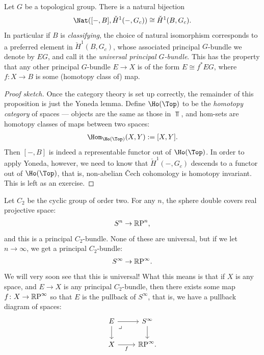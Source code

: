 \documentclass[11pt]{book}
\begin{document}
\begin{proposition}\label{prop:classifying-bundle}
Let $G$ be a topological group. There is a natural bijection
\[
\Nat([-,B], \check{H}^1(-,G_c)) \cong \check{H}^1(B,G_c).
\]
In particular if $B$ is \emph{classifying}, the choice of natural isomorphism corresponds to a preferred element in $\check{H}^1(B,G_c)$, whose associated principal $G$-bundle we denote by $EG$, and call it the \emph{universal principal $G$-bundle}. This has the property that any other principal $G$-bundle $E\to X$ is of the form $E\cong f^\ast EG$, where $f\colon X \to B$ is some (homotopy class of) map.
\end{proposition}
\begin{proof}[Proof sketch] Once the category theory is set up correctly, the remainder of this proposition is just the Yoneda lemma. Define $\Ho(\Top)$ to be the \emph{homotopy category} of spaces --- objects are the same as those in $\Top$, and hom-sets are homotopy classes of maps between two spaces:
\begin{align*}
    \Hom_{\Ho(\Top)}(X,Y) := [X,Y].
\end{align*}
Then $[-,B]$ is indeed a representable functor out of $\Ho(\Top)$. In order to apply Yoneda, however, we need to know that $\check{H}^1(-,G_c)$ descends to a functor out of $\Ho(\Top)$, that is, non-abelian \v{C}ech cohomology is homotopy invariant. This is left as an exercise.
\end{proof}

\begin{example}
\label{exa:universal-c2-bundle}    
Let $C_2$ be the cyclic group of order two. For any $n$, the sphere double covers real projective space:
\begin{align*}
    S^n \to {\mathbb{R}\text{P}}^n,
\end{align*}
and this is a principal $C_2$-bundle. None of these are universal, but if we let $n\to \infty$, we get a principal $C_2$-bundle:
\begin{align*}
    S^\infty \to {\mathbb{R}\text{P}}^\infty.
\end{align*}
We will very soon see that this is universal! What this means is that if $X$ is any space, and $E\to X$ is any principal $C_2$-bundle, then there exists some map $f \colon X \to {\mathbb{R}\text{P}}^\infty$ so that $E$ is the pullback of $S^\infty$, that is, we have a pullback diagram of spaces:
\[
\begin{tikzcd}
    E\rar\dar\pb & S^\infty\dar \\
    X\rar["f" below] & \RP^\infty.
\end{tikzcd}
\]
\end{example}
\end{document}
